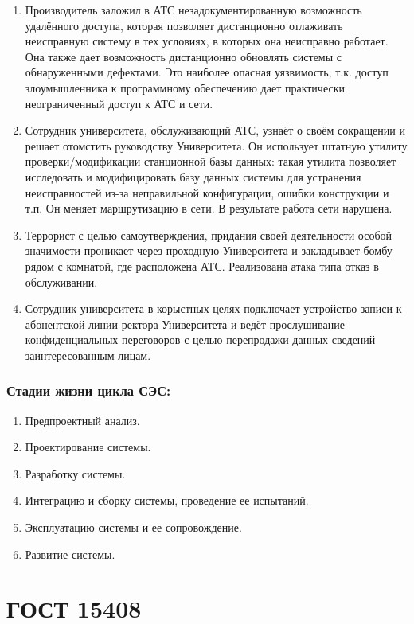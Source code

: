 \documentclass[12pt, russian, oneside, article]{ncc}
\begin{document}
\begin{enumerate}
\item Производитель заложил в АТС незадокументированную возможность удалённого доступа, которая позволяет дистанционно отлаживать неисправную систему в тех условиях, в которых она неисправно работает. Она также дает возможность дистанционно обновлять системы с обнаруженными дефектами. Это наиболее опасная уязвимость, т.к. доступ злоумышленника к программному обеспечению дает практически неограниченный доступ к АТС и сети.
\item Сотрудник университета, обслуживающий АТС, узнаёт о своём сокращении и решает отомстить руководству Университета. Он использует штатную утилиту проверки/модификации станционной базы данных: такая утилита позволяет исследовать и модифицировать базу данных системы для устранения неисправностей из-за неправильной конфигурации, ошибки конструкции и т.п. Он меняет маршрутизацию в сети. В результате работа сети нарушена.
\item Террорист с целью самоутверждения, придания своей деятельности особой значимости проникает через проходную Университета и закладывает бомбу рядом с комнатой, где расположена АТС. Реализована атака типа отказ в обслуживании.
\item Сотрудник университета в корыстных целях подключает устройство записи к абонентской линии ректора Университета и ведёт прослушивание конфиденциальных переговоров с целью перепродажи данных сведений заинтересованным лицам.
\end{enumerate}
\subsubsection{Стадии жизни цикла СЭС:}
\label{sec-2_1_4}


\begin{enumerate}
\item Предпроектный анализ.
\item Проектирование системы.
\item Разработку системы.
\item Интеграцию и сборку системы, проведение ее испытаний.
\item Эксплуатацию системы и ее сопровождение.
\item Развитие системы.
\end{enumerate}
\section{ГОСТ 15408}
\label{sec-3}
\end{document}

